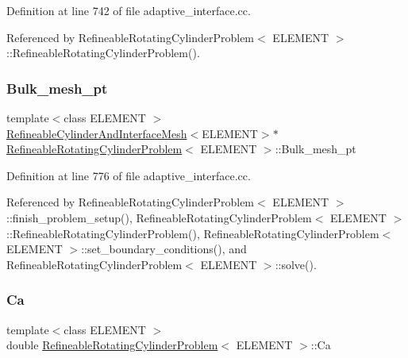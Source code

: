 Definition at line 742 of file adaptive\+\_\+interface.\+cc.



Referenced by Refineable\+Rotating\+Cylinder\+Problem$<$ E\+L\+E\+M\+E\+N\+T $>$\+::\+Refineable\+Rotating\+Cylinder\+Problem().

\mbox{\label{classRefineableRotatingCylinderProblem_aeb99a895bfdcceea6d13b41df7a59545}} 
\subsubsection{\texorpdfstring{Bulk\+\_\+mesh\+\_\+pt}{Bulk\_mesh\_pt}}
{\footnotesize\ttfamily template$<$class E\+L\+E\+M\+E\+NT $>$ \\
\hyperlink{classRefineableCylinderAndInterfaceMesh}{Refineable\+Cylinder\+And\+Interface\+Mesh}$<$E\+L\+E\+M\+E\+NT$>$$\ast$ \hyperlink{classRefineableRotatingCylinderProblem}{Refineable\+Rotating\+Cylinder\+Problem}$<$ E\+L\+E\+M\+E\+NT $>$\+::Bulk\+\_\+mesh\+\_\+pt}



Definition at line 776 of file adaptive\+\_\+interface.\+cc.



Referenced by Refineable\+Rotating\+Cylinder\+Problem$<$ E\+L\+E\+M\+E\+N\+T $>$\+::finish\+\_\+problem\+\_\+setup(), Refineable\+Rotating\+Cylinder\+Problem$<$ E\+L\+E\+M\+E\+N\+T $>$\+::\+Refineable\+Rotating\+Cylinder\+Problem(), Refineable\+Rotating\+Cylinder\+Problem$<$ E\+L\+E\+M\+E\+N\+T $>$\+::set\+\_\+boundary\+\_\+conditions(), and Refineable\+Rotating\+Cylinder\+Problem$<$ E\+L\+E\+M\+E\+N\+T $>$\+::solve().

\mbox{\label{classRefineableRotatingCylinderProblem_a2e47341fa1a71da29907ead94aeb5ec2}} 
\subsubsection{\texorpdfstring{Ca}{Ca}}
{\footnotesize\ttfamily template$<$class E\+L\+E\+M\+E\+NT $>$ \\
double \hyperlink{classRefineableRotatingCylinderProblem}{Refineable\+Rotating\+Cylinder\+Problem}$<$ E\+L\+E\+M\+E\+NT $>$\+::Ca}



